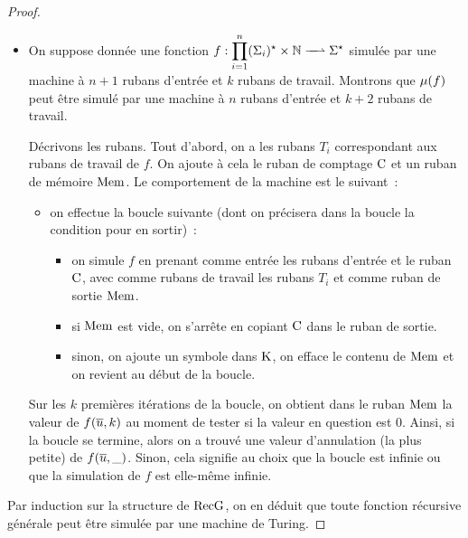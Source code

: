 \begin{proof}
\begin{itemize}
    L'itération sur $\TComp$ commence en ayant dans le ruban $\TAR$ la valeur de
    $f(\vec{\varwd})$ (où $\vec{\varwd}$ est le contenu des premiers rubans
    d'entrée).
    \`A chaque étape de cette itération, on déplace une lettre de $\TComp$ dans
    $\TMem$, de sorte que l'appel sur $g_{\varla}$ se fait en ayant en paramètre
    le mot $\varwd$ lu jusqu'à présent et dans la bande $\TAR$ le résultat de
    $\rec(f,(g_{\varla})_{\varla\in \ABB})$ sur le mot $\varwd$. Ainsi, la machine
    simule bien la fonction $\rec(f,(g_{\varla})_{\varla\in \ABB})$.
    
  \item On suppose donnée une fonction
    $\makeFunNamePartial{f}{\prod_{i = 1}^n \toStAP{i}\times\bN}{\toStA}$
    simulée par une machine à $n+1$ rubans d'entrée et $k$ rubans de travail.
    Montrons que $\mathbin{\mu}(f)$ peut être simulé par une machine à $n$ rubans
    d'entrée et $k + 2$ rubans de travail.

    Décrivons les rubans. Tout d'abord, on a les rubans $T_i$ correspondant aux
    rubans de travail de $f$. On ajoute à cela le ruban de comptage $\TComp$ et
    un ruban de mémoire $\TMem$.
    Le comportement de la machine est le suivant~:
    \begin{itemize}
    \item on effectue la boucle suivante (dont on précisera dans la boucle la
      condition pour en sortir)~:
      \begin{itemize}
      \item on simule $f$ en prenant comme entrée les rubans d'entrée et
        le ruban $\TComp$, avec comme rubans de travail les rubans $T_i$ et
        comme ruban de sortie $\TMem$.
      \item si $\TMem$ est vide, on s'arrête en copiant $\TComp$ dans le ruban
        de sortie.
      \item sinon, on ajoute un symbole dans $\Comp$, on efface le contenu de
        $\TMem$ et on revient au début de la boucle.
      \end{itemize}
    \end{itemize}

    Sur les $k$ premières itérations de la boucle, on obtient dans le ruban
    $\TMem$ la valeur de $f(\overline{u},k)$ au moment de tester si la valeur en
    question est $0$. Ainsi, si la boucle se termine, alors on a trouvé une
    valeur d'annulation (la plus petite) de $f(\overline{u},\_)$. Sinon,
    cela signifie au choix que la boucle est infinie ou que la simulation de
    $f$ est elle-même infinie.
  \end{itemize}

  Par induction sur la structure de $\operatorname{RecG}$, on en déduit que toute fonction
  récursive générale peut être simulée par une machine de Turing.
\end{proof}

